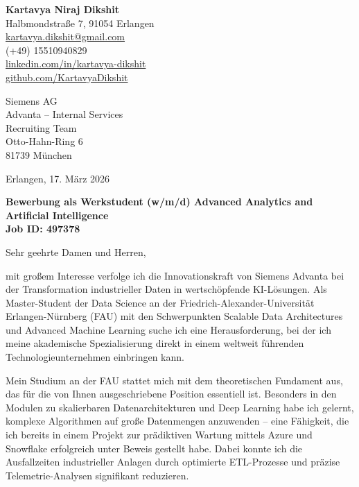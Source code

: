 \documentclass[10pt, a4paper]{article}
\begin{document}
\begin{flushright}
    \textbf{Kartavya Niraj Dikshit} \\
    Halbmondstraße 7, 91054 Erlangen \\
    \href{mailto:kartavya.dikshit@gmail.com}{kartavya.dikshit@gmail.com} \\
    (+49) 15510940829 \\
    \small \href{https://www.linkedin.com/in/kartavya-dikshit}{linkedin.com/in/kartavya-dikshit} \\
    \href{https://github.com/KartavyaDikshit}{github.com/KartavyaDikshit}
\end{flushright}

\vspace{10pt}

Siemens AG \\
Advanta – Internal Services \\
Recruiting Team \\
Otto-Hahn-Ring 6 \\
81739 München

\vspace{20pt}

Erlangen, 17. März 2026

\vspace{10pt}
\textbf{\large Bewerbung als Werkstudent (w/m/d) Advanced Analytics and Artificial Intelligence} \\
\textbf{Job ID: 497378}

\vspace{15pt}

Sehr geehrte Damen und Herren,

mit großem Interesse verfolge ich die Innovationskraft von Siemens Advanta bei der Transformation industrieller Daten in wertschöpfende KI-Lösungen. Als Master-Student der Data Science an der Friedrich-Alexander-Universität Erlangen-Nürnberg (FAU) mit den Schwerpunkten Scalable Data Architectures und Advanced Machine Learning suche ich eine Herausforderung, bei der ich meine akademische Spezialisierung direkt in einem weltweit führenden Technologieunternehmen einbringen kann.

Mein Studium an der FAU stattet mich mit dem theoretischen Fundament aus, das für die von Ihnen ausgeschriebene Position essentiell ist. Besonders in den Modulen zu skalierbaren Datenarchitekturen und Deep Learning habe ich gelernt, komplexe Algorithmen auf große Datenmengen anzuwenden – eine Fähigkeit, die ich bereits in einem Projekt zur prädiktiven Wartung mittels Azure und Snowflake erfolgreich unter Beweis gestellt habe. Dabei konnte ich die Ausfallzeiten industrieller Anlagen durch optimierte ETL-Prozesse und präzise Telemetrie-Analysen signifikant reduzieren.
\end{document}

